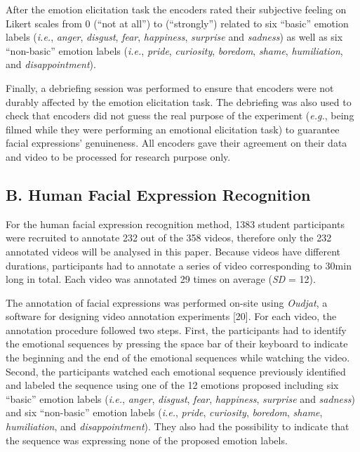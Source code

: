 \documentclass[conference,final,]{IEEEtran}
\begin{document}
After the emotion elicitation task the encoders rated their subjective
feeling on Likert scales from 0 (``not at all'') to 
\nolinebreak (``strongly'') related to six ``basic'' emotion labels
(\emph{i.e.}, \emph{anger}, \emph{disgust}, \emph{fear},
\emph{happiness}, \emph{surprise} and \emph{sadness}) as well as six
``non-basic'' emotion labels (\emph{i.e.}, \emph{pride},
\emph{curiosity}, \emph{boredom}, \emph{shame}, \emph{humiliation}, and
\emph{disappointment}).

Finally, a debriefing session was performed to ensure that encoders were
not durably affected by the emotion elicitation task. The debriefing was
also used to check that encoders did not guess the real purpose of the
experiment (\emph{e.g.}, being filmed while they were performing an
emotional elicitation task) to guarantee facial expressions'
genuineness. All encoders gave their agreement on their data and video
to be processed for research purpose only.

\hypertarget{b.-human-facial-expression-recognition}{%
\subsection{B. Human Facial Expression
Recognition}\label{b.-human-facial-expression-recognition}}

For the human facial expression recognition method, 1383
\nolinebreak student participants were recruited to annotate 232 out of
the 358 videos, therefore only the 232 annotated videos will be analysed
in this paper. Because videos have different durations, participants had
to annotate a series of video corresponding to 30min long in total. Each
video was annotated 29 times on average (\emph{SD} = 12).

The annotation of facial expressions was performed on-site using
\emph{Oudjat}, a software for designing video annotation experiments
{[}20{]}. For each video, the annotation procedure followed two steps.
First, the participants had to identify the emotional sequences by
pressing the space bar of their keyboard to indicate the beginning and
the end of the emotional sequences while watching the video. Second, the
participants watched each emotional sequence previously identified and
labeled the sequence using one of the 12 \nolinebreak emotions proposed
including six ``basic'' emotion labels (\emph{i.e.}, \emph{anger},
\emph{disgust}, \emph{fear}, \emph{happiness}, \emph{surprise} and
\emph{sadness}) and six ``non-basic'' emotion labels (\emph{i.e.},
\emph{pride}, \emph{curiosity}, \emph{boredom}, \emph{shame},
\emph{humiliation}, and \emph{disappointment}). They also had the
possibility to indicate that the sequence was expressing none of the
proposed emotion labels.
\end{document}
